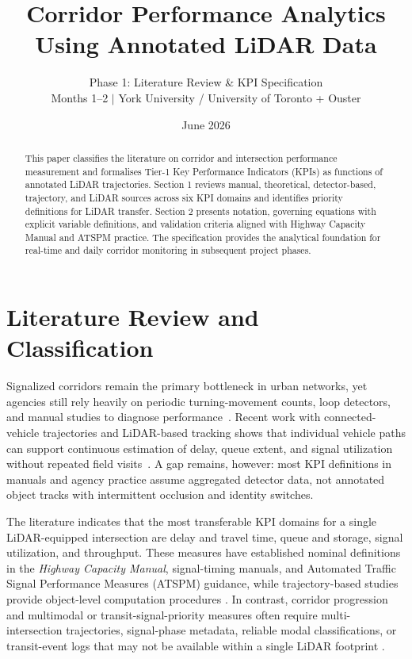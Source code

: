 \documentclass[11pt]{article}
\title{\color{headingblue}\bfseries Corridor Performance Analytics\\[0.25em]
Using Annotated LiDAR Data}
\author{Phase 1: Literature Review \& KPI Specification\\[0.5em]
\small Months 1--2 $\mid$ York University / University of Toronto + Ouster}
\date{June 2026}
\begin{document}
\maketitle

\begin{abstract}
This paper classifies the literature on corridor and intersection performance measurement and formalises Tier-1 Key Performance Indicators (KPIs) as functions of annotated LiDAR trajectories. Section 1 reviews manual, theoretical, detector-based, trajectory, and LiDAR sources across six KPI domains and identifies priority definitions for LiDAR transfer. Section 2 presents notation, governing equations with explicit variable definitions, and validation criteria aligned with Highway Capacity Manual and ATSPM practice. The specification provides the analytical foundation for real-time and daily corridor monitoring in subsequent project phases.
\end{abstract}

\section{Literature Review and Classification}

Signalized corridors remain the primary bottleneck in urban networks, yet agencies still rely heavily on periodic turning-movement counts, loop detectors, and manual studies to diagnose performance~\cite{hcm,bonneson}. Recent work with connected-vehicle trajectories and LiDAR-based tracking shows that individual vehicle paths can support continuous estimation of delay, queue extent, and signal utilization without repeated field visits~\cite{hunter,kotb,bhaskar}. A gap remains, however: most KPI definitions in manuals and agency practice assume aggregated detector data, not annotated object tracks with intermittent occlusion and identity switches.

The literature indicates that the most transferable KPI domains for a single
LiDAR-equipped intersection are delay and travel time, queue and storage,
signal utilization, and throughput. These measures have established nominal
definitions in the \emph{Highway Capacity Manual}, signal-timing manuals, and
Automated Traffic Signal Performance Measures (ATSPM) guidance, while
trajectory-based studies provide object-level computation procedures
\cite{nasem2022hcm,nasem2015stm,fhwa2020atspm,liu2009queue,
ashqer2022uav}. In contrast, corridor progression and multimodal or
transit-signal-priority measures often require multi-intersection trajectories,
signal-phase metadata, reliable modal classifications, or transit-event logs
that may not be available within a single LiDAR footprint
\cite{mahmud2022coordination,fhwaTSP}.
\end{document}
